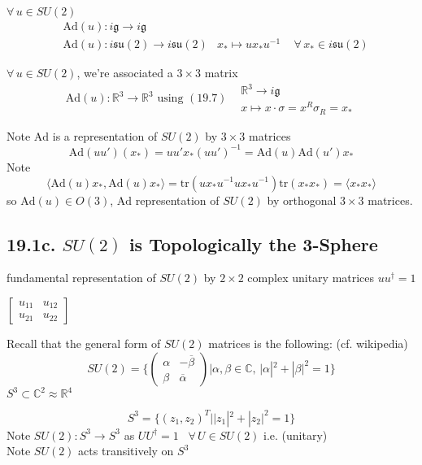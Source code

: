 $\forall \, u \in SU(2)$ 
\[
\begin{aligned}
  & \text{Ad}(u) : i\mathfrak{g} \to i\mathfrak{g} \\ 
  & \text{Ad}(u) : i\mathfrak{su}(2) \to i\mathfrak{su}(2)
  & x_* \mapsto ux_*u^{-1} \quad \, \forall \, x_* \in i \mathfrak{su}(2)
\end{aligned}
\]

$\forall \, u \in SU(2)$, we're associated a $3\times 3$ matrix
\[
\text{Ad}(u) : \mathbb{R}^3 \to \mathbb{R}^3 \text{ using } (19.7) \begin{aligned}
  & \mathbb{R}^3 \to i\mathfrak{g} \\
  & x \mapsto x\cdot \sigma = x^R \sigma_R = x_* \end{aligned}
\]

Note $\text{Ad}$ is a representation of $SU(2)$ by $3\times 3$ matrices
\[
\text{Ad}(uu')(x_*) = uu'x_* (uu')^{-1} = \text{Ad}(u)\text{Ad}(u')x_*
\]
Note
\[
\langle \text{Ad}(u)x_* , \text{Ad}(u) x_* \rangle = \text{tr}(ux_*u^{-1}ux_*u^{-1}) \text{tr}(x_* x_*) = \langle x_* x_* \rangle
\]
so $\text{Ad}(u) \in O(3)$, $\text{Ad}$ representation of $SU(2)$ by orthogonal $3\times 3$ matrices.

\subsection{19.1c. $SU(2)$ is Topologically the 3-Sphere}

fundamental representation of $SU(2)$ by $2\times 2$ complex unitary matrices $uu^{\dag}=1$

$\left[ \begin{matrix} u_{11} & u_{12} \\ u_{21} & u_{22} \end{matrix} \right]$

Recall that the general form of $SU(2)$ matrices is the following: (cf. wikipedia)
\[
SU(2) = \lbrace \left( \begin{matrix} \alpha & - \overline{\beta} \\ \beta & \overline{\alpha} \end{matrix} \right) | \alpha , \beta \in \mathbb{C}, \, |\alpha|^2 + |\beta|^2 = 1 \rbrace
\]
$S^3 \subset \mathbb{C}^2 \approx \mathbb{R}^4$

\[
S^3 = \lbrace (z_1, z_2)^T | |z_1|^2 + |z_2|^2 = 1 \rbrace
\]
Note $SU(2) : S^3 \to S^3$ as $UU^{\dag}=1$ \quad \, $\forall \, U \in SU(2)$ i.e. (unitary) \\
Note $SU(2)$ acts transitively on $S^3$ \\


